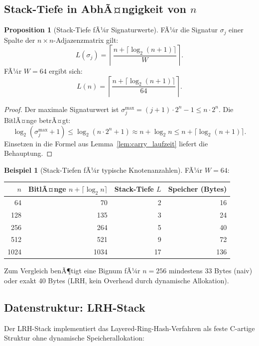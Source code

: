 ﻿\documentclass[a4paper,12pt]{article}
\theoremstyle{definition}
\newtheorem{beispiel}{Beispiel}
\newtheorem{proposition}{Proposition}
\begin{document}
\subsection{Stack-Tiefe in AbhÃ¤ngigkeit von $n$}

\begin{proposition}[Stack-Tiefe fÃ¼r Signaturwerte]
\label{prop:stacktiefe}
FÃ¼r die Signatur $\sigma_j$ einer Spalte der $n \times n$-Adjazenzmatrix gilt:
\[
  L(\sigma_j) = \left\lceil \frac{n + \lceil \log_2(n+1) \rceil}{W} \right\rceil.
\]
FÃ¼r $W = 64$ ergibt sich:
\[
  L(n) = \left\lceil \frac{n + \lceil \log_2(n+1) \rceil}{64} \right\rceil.
\]
\end{proposition}

\begin{proof}
Der maximale Signaturwert ist $\sigma_j^{\max} = (j+1) \cdot 2^n - 1 \leq n \cdot 2^n$.
Die BitlÃ¤nge betrÃ¤gt:
\[
  \log_2(\sigma_j^{\max} + 1) \leq \log_2(n \cdot 2^n + 1)
  \approx n + \log_2 n \leq n + \lceil \log_2(n+1) \rceil.
\]
Einsetzen in die Formel aus Lemma~\ref{lem:carry_laufzeit} liefert die Behauptung.
\end{proof}

\begin{beispiel}[Stack-Tiefen fÃ¼r typische Knotenanzahlen]
\label{bsp:stacktiefe}
FÃ¼r $W = 64$:
\begin{center}
\begin{tabular}{rrrr}
\toprule
$n$ & BitlÃ¤nge $n + \lceil\log_2 n\rceil$ & Stack-Tiefe $L$ & Speicher (Bytes) \\
\midrule
 64 &  70 & 2 & 16 \\
128 & 135 & 3 & 24 \\
256 & 264 & 5 & 40 \\
512 & 521 & 9 & 72 \\
1024 & 1034 & 17 & 136 \\
\bottomrule
\end{tabular}
\end{center}
Zum Vergleich benÃ¶tigt eine Bignum fÃ¼r $n=256$ mindestens 33 Bytes (naiv)
oder exakt 40 Bytes (LRH, kein Overhead durch dynamische Allokation).
\end{beispiel}

\subsection{Datenstruktur: LRH-Stack}

Der LRH-Stack implementiert das Layered-Ring-Hash-Verfahren als feste C-artige Struktur
ohne dynamische Speicherallokation:
\end{document}

